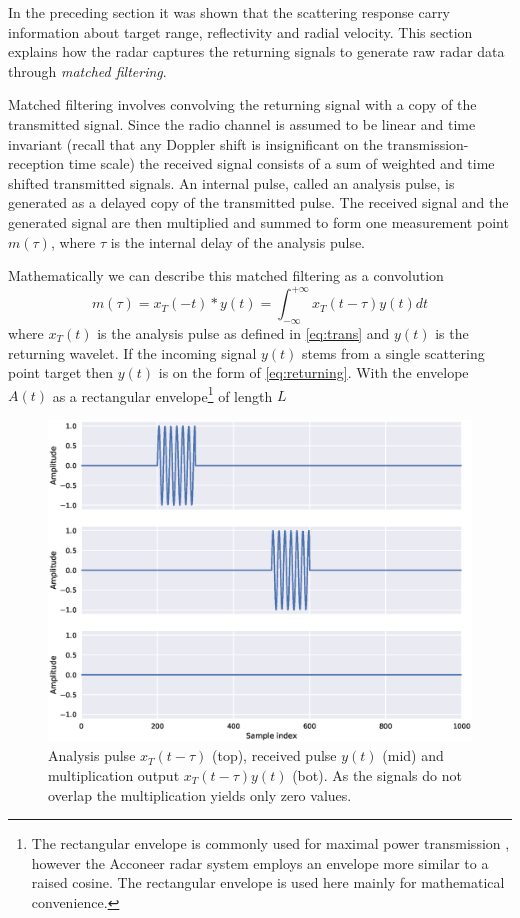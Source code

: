 In the preceding section it was shown that the scattering response carry information about target range, reflectivity and radial velocity. This section explains how the radar captures the returning signals to generate raw radar data through \emph{matched filtering}.

Matched filtering involves convolving the returning signal with a copy of the transmitted signal. Since the radio channel is assumed to be linear and time invariant (recall that any Doppler shift is insignificant on the transmission-reception time scale) the received signal consists of a sum of weighted and time shifted transmitted signals. An internal pulse, called an analysis pulse, is generated as a delayed copy of the transmitted pulse. The received signal and the generated signal are then multiplied and summed to form one measurement point $m(\tau)$, where $\tau$ is the internal delay of the analysis pulse. 

Mathematically we can describe this matched filtering as a convolution
\begin{equation}
	m(\tau) 
	= x_T(-t) * y(t)
	= \int_{-\infty}^{+\infty} x_T(t - \tau)y(t) dt
\end{equation}
where $x_T(t)$ is the analysis pulse as defined in \eqref{eq:trans} and $y(t)$ is the returning wavelet. If the incoming signal $y(t)$ stems from a single scattering point target then $y(t)$ is on the form of \eqref{eq:returning}. With the envelope $A(t)$ as a rectangular envelope\footnote{The rectangular envelope is commonly used for maximal power transmission \citep{richards_2014}, however the Acconeer radar system employs an envelope more similar to a raised cosine. The rectangular envelope is used here mainly for mathematical convenience.} of length $L$

\begin{figure}[t]
	\centering
	\includegraphics[scale=0.5]{figs_temp/mixing0}
	\caption{Analysis pulse $x_T(t-\tau)$ (top), received pulse $y(t)$ (mid) and multiplication output $x_T(t-\tau)y(t)$ (bot). As the signals do not overlap the multiplication yields only zero values.}
	\label{fig:mix0}
\end{figure}

